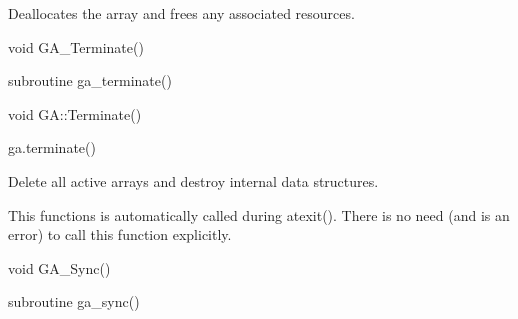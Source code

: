 \documentclass[10pt]{article}
\begin{document}
\gcoll

\begin{desc}

Deallocates the array and frees any associated resources.

\end{desc}


\begin{capi}
\begin{ccode}
void GA_Terminate()
\end{ccode}
\end{capi}

\begin{fapi}
\begin{fcode}
subroutine ga_terminate()
\end{fcode}
\end{fapi}

\begin{cxxapi}
\begin{cxxcode}
void GA::Terminate()
\end{cxxcode}
\end{cxxapi}

\begin{pyapi}
\begin{pycode}
ga.terminate()
\end{pycode}
\end{pyapi}

\wcoll

\begin{desc}

Delete all active arrays and destroy internal data structures.

\end{desc}

\begin{pydesc}

This functions is automatically called during atexit(). There is no need (and
is an error) to call this function explicitly.

\end{pydesc}


\begin{capi}
\begin{ccode}
void GA_Sync()
\end{ccode}
\end{capi}

\begin{fapi}
\begin{fcode}
subroutine ga_sync()
\end{fcode}
\end{fapi}
\end{document}
